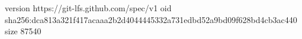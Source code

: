 version https://git-lfs.github.com/spec/v1
oid sha256:dca813a321f417acaaa2b2d4044445332a731edbd52a9bd09f628bd4cb3ac440
size 87540
